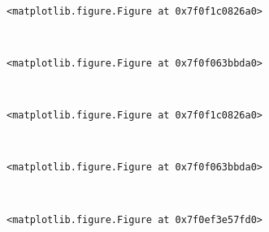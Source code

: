 \documentclass[11pt]{article}
\begin{document}
    
    \begin{center}
    \end{center}
    { \hspace*{\fill} \\}
    
    
    \begin{verbatim}
<matplotlib.figure.Figure at 0x7f0f1c0826a0>
    \end{verbatim}

    
    \begin{center}
    \end{center}
    { \hspace*{\fill} \\}
    
    
    \begin{verbatim}
<matplotlib.figure.Figure at 0x7f0f063bbda0>
    \end{verbatim}

    
    \begin{center}
    \end{center}
    { \hspace*{\fill} \\}
    
    
    \begin{verbatim}
<matplotlib.figure.Figure at 0x7f0f1c0826a0>
    \end{verbatim}

    
    \begin{center}
    \end{center}
    { \hspace*{\fill} \\}
    
    
    \begin{verbatim}
<matplotlib.figure.Figure at 0x7f0f063bbda0>
    \end{verbatim}

    
    \begin{center}
    \end{center}
    { \hspace*{\fill} \\}
    
    
    \begin{verbatim}
<matplotlib.figure.Figure at 0x7f0ef3e57fd0>
    \end{verbatim}
\end{document}
